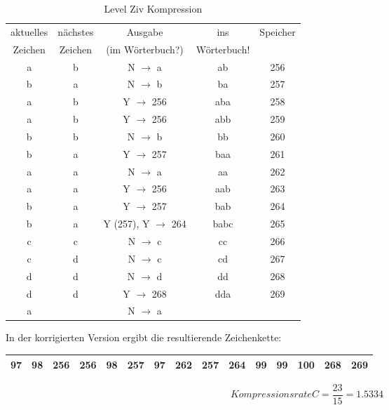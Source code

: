 \documentclass[12pt,german]{article}
\begin{document}
\begin{table}[H]
  \centering
  \begin{tabular}{c | c | c | c | c |}
    \hline
   	aktuelles  & nächstes  & Ausgabe  & ins & Speicher \\
   	 Zeichen &  Zeichen &  (im Wörterbuch?) & Wörterbuch! &  \\
	a & b & N $ \rightarrow $ a & ab & 256 \\
	b & a & N $ \rightarrow $ b & ba & 257 \\
	a & b & Y $ \rightarrow $ 256 & aba & 258 \\
	a & b & Y $ \rightarrow $ 256 & abb & 259 \\
	b & b & N $ \rightarrow $ b & bb & 260 \\
	b & a & Y $ \rightarrow $ 257 & baa & 261 \\
	a & a & N $ \rightarrow $ a & aa & 262 \\
	a & a & Y $ \rightarrow $ 256 & aab & 263 \\
	b & a & Y $ \rightarrow $ 257 & bab & 264 \\
	b & a & Y (257), Y $ \rightarrow $ 264 & babc & 265 \\
	c & c & N $ \rightarrow $ c & cc & 266 \\
	c & d & N $ \rightarrow $ c & cd & 267 \\
	d & d & N $ \rightarrow $ d & dd & 268 \\
	d & d & Y $ \rightarrow $ 268 & dda & 269 \\
	a &   & N $ \rightarrow $ a &     &   \\ 
   	
  \end{tabular}
  \caption{Level Ziv Kompression}
  \label{tab:Level Ziv Kompression}
\end{table}

In der korrigierten Version ergibt die resultierende Zeichenkette: 

\begin{table}[H]
  \centering
  \begin{tabular}{| c | c | c | c | c | c | c | c | c | c | c | c | c | c | c |}
    \hline
    97 & 98& 256 & 256 & 98 & 257 & 97 & 262 & 257 & 264 & 99 & 99 & 100 & 268 & 269 \\
    \hline
  \end{tabular}
\end{table}


\begin{equation}[H]
 Kompressionsrate C = \frac{23}{15} = 1.5334	
\end{equation}
\end{document}
